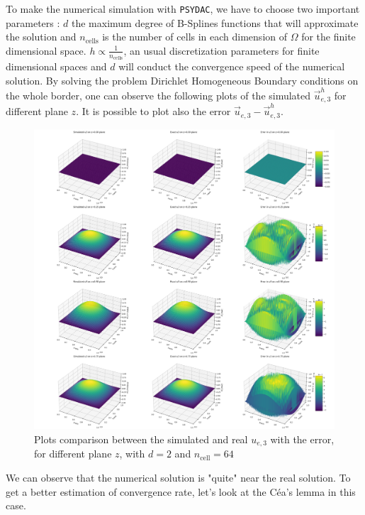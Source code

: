 \documentclass[a4paper,12pt,twoside]{report}
\begin{document}
To make the numerical simulation with \texttt{PSYDAC}, we have to choose two important parameters : $d$ the maximum degree of B-Splines functions that will approximate the solution and $n_{\text{cells}}$ is the number of cells in each dimension of $\Omega$ for the finite dimensional space. $\displaystyle h \propto \frac{1}{n_{\text{cells}}}$, an usual discretization parameters for finite dimensional spaces and $d$ will conduct the convergence speed of the numerical solution. 
By solving the problem Dirichlet Homogeneous Boundary conditions on the whole border, one can observe the following plots of the simulated $\vec u_{e,3}^h$ for different plane $z$. It is possible to plot also the error $\vec u_{e,3} - \vec u_{e,3}^h$.

\newpage

\begin{figure}
    \centering
    \includegraphics[width=0.9\linewidth]{3d_plots_degree_2_non_mixed_dirichlet_homogeneous_ncell=64.png}
    \caption{Plots comparison between the simulated and real $u_{e,3}$ with the error, for different plane $z$, with $d=2$ and $n_{\text{cell}} = 64$}
    \label{fig:3D_plots}
\end{figure}

We can observe that the numerical solution is "quite" near the real solution. To get a better estimation of convergence rate, let's look at the Céa's lemma in this case.
\end{document}
